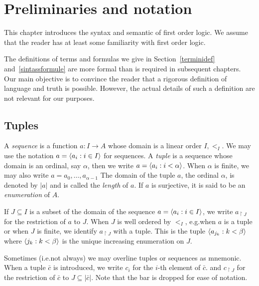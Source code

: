 \chapter{Preliminaries and notation}\label{termini}
This chapter introduces the syntax and semantic of first order logic. We assume that the reader has at least some familiarity with first order logic. 

The definitions of terms and formulas we give in Section~\ref{terminidef} and~\ref{sintassformule} are more formal than is required in subsequent chapters. Our main objective is to convince the reader that a rigorous definition of language and truth is possible. However, the actual details of such a definition are not relevant for our purposes.



\section{Tuples}

A \emph{sequence\/} is a function  $a:I\to A$ whose domain is a linear order $I,<_I$.
We may use the notation \emph{$a=\langle a_i: i\in I\rangle$} for sequences.
A \emph{tuple\/} is a sequence whose domain is an ordinal, say $\alpha$, then we write  $a=\langle a_i: i<\alpha\rangle$.
When $\alpha$ is finite, we may also write \emph{$a=a_0,\dots,a_{\alpha-1}$}
The domain of the tuple $a$, the ordinal $\alpha$, is denoted by \emph{$|a|$\/} and is called the \emph{length\/} of $a$.
If $a$ is surjective, it is said to be an \emph{enumeration\/} of $A$.

If $J\subseteq I$ is a subset of the domain of the sequence $a=\langle a_i: i\in I\rangle$, we write  \emph{$a_{\restriction J}$} for the restriction of $a$ to $J$.
When $J$ is well ordered by $<_I$, e.g.\@ when $a$ is a tuple or when $J$ is finite, we identify $a_{\restriction J}$ with a tuple.
This is the tuple $\langle a_{j_k}: k<\beta\rangle$ where $\langle j_k:k<\beta\rangle$ is the unique increasing enumeration on $J$.

\noindent\llap{\textcolor{red}{\Large\danger}\kern1.5ex}Sometimes (i.e.\@ not always) we may overline tuples or sequences as mnemonic.
When a tuple $\bar c$ is introduced, we write $c_i$ for the $i$-th element of $\bar c$.
and $c_{\restriction J}$ for the restriction of $\bar c$ to $J\subseteq |\bar c|$.
Note that the bar is dropped for ease of notation.

